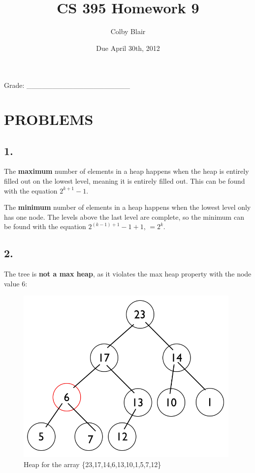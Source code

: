 \documentclass[11pt,letterpaper]{article}
\date{Due April 30th, 2012}
\title{CS 395 Homework 9}
\author{Colby Blair}
\begin{document}
\maketitle

\begin{center}

Grade: \_\_\_\_\_\_\_\_\_\_\_\_\_\_\_\_\_\_\_\_
\end{center}

\thispagestyle{empty}

\pagebreak


\section*{PROBLEMS}

\subsection*{1.}
The \textbf{maximum} number of elements in a heap happens when the heap is entirely filled out on the 
lowest level, meaning it is entirely filled out. This can be found with the equation $ 2^{k + 1} - 1 $.

The \textbf{minimum} number of elements in a heap happens when the lowest level only has one node.
The levels above the last level are complete, so the minimum can be found with the equation 
$2^{(k-1) + 1} - 1 + 1$, $ = 2^k$.


\subsection*{2.}
The tree is \textbf{not a max heap}, as it violates the max heap property with the node value 6:

\begin{figure}[!h]

	\begin{center}
	\includegraphics[width=110mm]{images/6_6_tree.png}
	\end{center}

\caption{Heap for the array \{23,17,14,6,13,10,1,5,7,12\} }
\end{figure}
\end{document}
